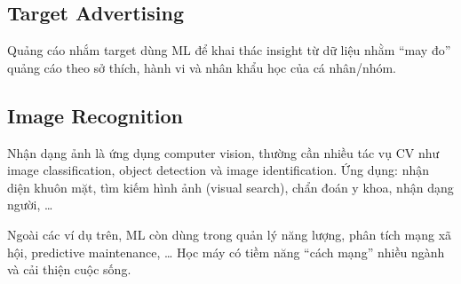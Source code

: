 \subsection{Target Advertising}

\begin{dinhnghia}[title={Quảng cáo nhắm target}]
Quảng cáo nhắm target dùng ML để khai thác insight từ dữ liệu nhằm “may đo” quảng cáo theo sở thích, hành vi và nhân khẩu học của cá nhân/nhóm.
\end{dinhnghia}

\subsection{Image Recognition}

\begin{dinhnghia}[title={Nhận dạng ảnh}]
Nhận dạng ảnh là ứng dụng computer vision, thường cần nhiều tác vụ CV như image classification, object detection và image identification.
Ứng dụng: nhận diện khuôn mặt, tìm kiếm hình ảnh (visual search), chẩn đoán y khoa, nhận dạng người, \ldots
\end{dinhnghia}

\begin{luuy}[title={Kết luận}]
Ngoài các ví dụ trên, ML còn dùng trong quản lý năng lượng, phân tích mạng xã hội, predictive maintenance, \ldots
Học máy có tiềm năng “cách mạng” nhiều ngành và cải thiện cuộc sống.
\end{luuy}
